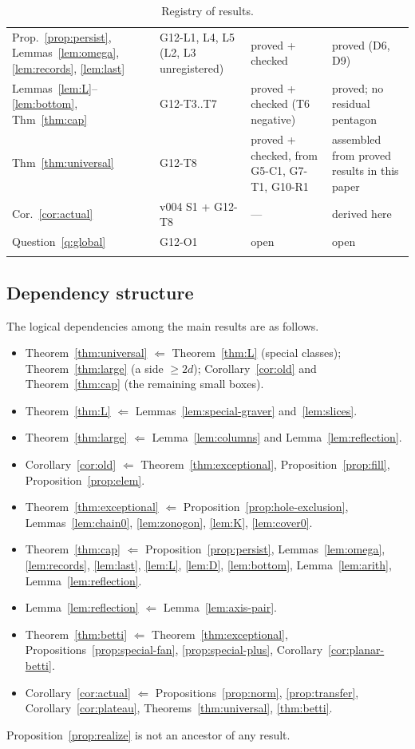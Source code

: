\begin{longtable}{@{}p{2.9cm}p{2.8cm}p{3.0cm}p{4.6cm}@{}}
Prop.~\ref{prop:persist}, Lemmas~\ref{lem:omega}, \ref{lem:records}, \ref{lem:last} & G12-L1, L4, L5 (L2, L3 unregistered) & proved + checked & proved (D6, D9)\\
Lemmas~\ref{lem:L}--\ref{lem:bottom}, Thm~\ref{thm:cap} & G12-T3..T7 & proved + checked (T6 negative) & proved; no residual pentagon\\
Thm~\ref{thm:universal} & G12-T8 & proved + checked, from G5-C1, G7-T1, G10-R1 & assembled from proved results in this paper\\
Cor.~\ref{cor:actual} & v004 S1 + G12-T8 & --- & derived here\\
Question~\ref{q:global} & G12-O1 & open & open\\
\bottomrule
\caption{Registry of results.}\label{tab:registry}
\end{longtable}

\subsection{Dependency structure}

The logical dependencies among the main results are as follows.
\begin{itemize}
\item Theorem~\ref{thm:universal} $\Leftarrow$ Theorem~\ref{thm:L} (special classes); Theorem~\ref{thm:large} (a side $\ge2d$); Corollary~\ref{cor:old} and Theorem~\ref{thm:cap} (the remaining small boxes).
\item Theorem~\ref{thm:L} $\Leftarrow$ Lemmas~\ref{lem:special-graver} and~\ref{lem:slices}.
\item Theorem~\ref{thm:large} $\Leftarrow$ Lemma~\ref{lem:columns} and Lemma~\ref{lem:reflection}.
\item Corollary~\ref{cor:old} $\Leftarrow$ Theorem~\ref{thm:exceptional}, Proposition~\ref{prop:fill}, Proposition~\ref{prop:elem}.
\item Theorem~\ref{thm:exceptional} $\Leftarrow$ Proposition~\ref{prop:hole-exclusion}, Lemmas~\ref{lem:chain0}, \ref{lem:zonogon}, \ref{lem:K}, \ref{lem:cover0}.
\item Theorem~\ref{thm:cap} $\Leftarrow$ Proposition~\ref{prop:persist}, Lemmas~\ref{lem:omega}, \ref{lem:records}, \ref{lem:last}, \ref{lem:L}, \ref{lem:D}, \ref{lem:bottom}, Lemma~\ref{lem:arith}, Lemma~\ref{lem:reflection}.
\item Lemma~\ref{lem:reflection} $\Leftarrow$ Lemma~\ref{lem:axis-pair}.
\item Theorem~\ref{thm:betti} $\Leftarrow$ Theorem~\ref{thm:exceptional}, Propositions~\ref{prop:special-fan}, \ref{prop:special-plus}, Corollary~\ref{cor:planar-betti}.
\item Corollary~\ref{cor:actual} $\Leftarrow$ Propositions~\ref{prop:norm}, \ref{prop:transfer}, Corollary~\ref{cor:plateau}, Theorems~\ref{thm:universal}, \ref{thm:betti}.
\end{itemize}
Proposition~\ref{prop:realize} is not an ancestor of any result.
